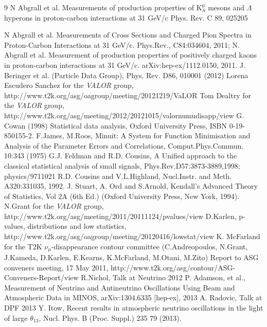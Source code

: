 \begin{thebibliography}{9}
  N Abgrall et al. Measurements of production properties of K$^{0}_{S}$ mesons and $\Lambda$ hyperons in proton-carbon interactions at 31 GeV/c
  Phys. Rev. C 89, 025205

  N Abgrall et al. Measurements of Cross Sections and Charged Pion Spectra in Proton-Carbon Interactions
  at 31 GeV/c. Phys.Rev., C84:034604, 2011;
  N. Abgrall et al. Measurement of production properties of positively charged kaons in proton-carbon
  interactions at 31 GeV/c. arXiv:hep-ex/1112.0150, 2011.
%
%
  J. Beringer et al. (Particle Data Group), Phys. Rev. D86, 010001 (2012)
%
%
  Lorena Escudero Sanchez for the {\em VALOR} group, 
  http://www.t2k.org/asg/oagroup/meeting/20121219/VaLOR%
  Tom Dealtry for the {\em VALOR} group,
  http://www.t2k.org/asg/meeting/2012/20121015/valornumudisapp/view
%
%
  G. Cowan (1998) Statistical data analysis, 
  Oxford University Press, ISBN 0-19-850155-2.
  F.James, M.Roos, Minuit: A System for Function Minimisation and Analysis of the 
  Parameter Errors and Correlations, Comput.Phys.Commun. 10:343 (1975)
  G.J. Feldman and R.D. Cousins,
  A Unified approach to the classical statistical analysis of small signals,
  Phys.Rev.D57:3873-3889,1998; physics/9711021
  R.D. Cousins and V.L.Highland, 
  Nucl.Instr. and Meth. A320:331035, 1992.
J. Stuart, A. Ord and S.Arnold,
Kendall's Advanced Theory of Statistics, Vol 2A (6th Ed.) 
(Oxford University Press, New York, 1994).
 N.Grant for the {\em VALOR} group,
 http://www.t2k.org/asg/meeting/2011/20111124/pvalues/view
 D.Karlen,
 p-values, distributions and low statistics,
 http://www.t2k.org/asg/oagroup/meeting/20120416/lowstat/view
%
%
  K. McFarland for the T2K $\nu_{\mu}$-disappearance contour committee 
  (C.Andreopoulos, N.Grant, J.Kameda, D.Karlen, E.Kearns, K.McFarland, M.Otani, M.Zito)
  Report to ASG conveners meeting, 17 May 2011,
  http://www.t2k.org/asg/contour/ASG-Conveners-Report/view
%
%
  R.Nichol,
  Talk at Neutrino 2012
  P. Adamson, et al.,
  Measurement of Neutrino and Antineutrino Oscillations Using Beam and Atmospheric Data in MINOS,
  arXiv:1304.6335 [hep-ex], 2013
  A. Radovic,
  Talk at DPF 2013
  Y. Itow,
  Recent results in atmospheric neutrino oscillations in the light of large $\theta_{13}$,
  Nucl. Phys. B (Proc. Suppl.) 235 79 (2013).


\end{thebibliography}
